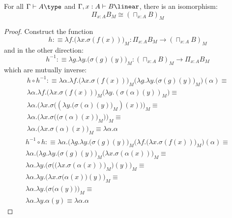 \begin{thm}
  For all $\Gamma \vdash A \type$ and $\Gamma, x : A \vdash B \linear$, there is an isomorphism:
  \[
    \Pi_{x : A}B_M \cong (\sqcap_{x : A}B)_M
  \]
  \begin{proof}
    Construct the function 
    \[
      h :\equiv \lambda f. \big ( \lambda x. \sigma(f(x))\big)_M : \Pi_{x : A}B_M \to (\sqcap_{x : A}B)_M
    \]
    and in the other direction:
    \[
      h^{-1} :\equiv \lambda g. \lambda y. \big (\sigma(g)(y)\big )_M  : (\sqcap_{x : A}B)_M \to \Pi_{x :A}B_M
    \]
    which are mutually inverse:
    \[
      \begin{split}
        h \circ h^{-1} : \equiv \lambda \alpha . \lambda f. \big (\lambda x. \sigma(f(x)) \big)_M \Big (\lambda g. \lambda y. \big (\sigma(g)(y)\big )_M  \Big ) (\alpha) \equiv \\
        \lambda \alpha . \lambda f. \big ( \lambda x. \sigma(f(x)) \big )_M \big (\lambda y. (\sigma(\alpha)(y))_M \big ) \equiv \\
        \lambda \alpha . \Big (\lambda x. \sigma \Big ((\lambda y. \big (\sigma(\alpha)(y)\big )_M)(x)\Big ) \Big )_M \equiv \\
        \lambda \alpha . \Big (\lambda x. \sigma \Big (\big (\sigma(\alpha)(x)\big )_M\Big ) \Big )_M \equiv \\
        \lambda \alpha . \Big (\lambda x. \sigma(\alpha)(x) \Big )_M \equiv
        \lambda \alpha. \alpha
      \end{split}
    \]
    \[
      \begin{split}
        h^{-1} \circ h : \equiv \lambda \alpha . (\lambda g. \lambda y. \big (\sigma(g)(y)\big )_M   \Big (\lambda f. \big (\lambda x. \sigma(f(x)) \big)_M \Big ) (\alpha) \equiv \\
       \lambda \alpha . (\lambda g. \lambda y. \big (\sigma(g)(y)\big )_M   \big (\lambda x. \sigma(\alpha(x)) \big)_M \equiv \\
       \lambda \alpha . \lambda y. \big (\sigma \Big (\big (\lambda x. \sigma(\alpha(x)) \big)_M \Big )(y)\big )_M    \equiv \\
       \lambda \alpha . \lambda y. \big ( \lambda x. \sigma \big (\alpha(x) \big)(y)\big )_M    \equiv \\
       \lambda \alpha . \lambda y. \big ( \sigma\big (\alpha(y) \big ) \big )_M    \equiv \\
       \lambda \alpha . \lambda y. \alpha(y)   \equiv \lambda \alpha. \alpha
      \end{split}
    \]
  \end{proof}
\end{thm}
